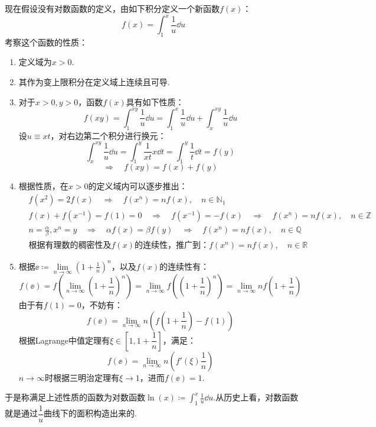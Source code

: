 现在假设没有对数函数的定义，由如下积分定义一个新函数$f(x)$：
\[f(x) = \int_{1}^{x}\frac{1}{u}\dd{u}\]
考察这个函数的性质：
\begin{enumerate}[circ]
    \item 定义域为$x>0$.
    \item 其作为变上限积分在定义域上连续且可导.
    \item 对于$x>0,y>0$，函数$f(x)$具有如下性质：
    \[f(xy) = \int_{1}^{xy}\frac{1}{u}\dd{u} = \int_{1}^{x}\frac{1}{u}\dd{u} + \int_{x}^{xy}\frac{1}{u}\dd{u}\]
    设$u \equiv xt$，对右边第二个积分进行换元：
    \[\int_{x}^{xy}\frac{1}{u}\dd{u} = \int_{1}^{y}\frac{1}{xt}x\dd{t} = \int_{1}^{y}\frac{1}{t}\dd{t} = f(y)\]
    \[\Rightarrow\quad f(xy) = f(x) + f(y)\]
    \item 根据性质，在$x>0$的定义域内可以逐步推出：
    \begin{align*}
        &f(x^2) = 2f(x) \quad\Rightarrow\quad f(x^n) = nf(x),\quad n\in\mathbb{N}_1\\
        &f(x)+f(x^{-1}) = f(1) = 0 \quad\Rightarrow\quad f(x^{-1}) = -f(x) \quad\Rightarrow\quad f(x^n) = nf(x),\quad n\in\mathbb{Z}\\
        &n=\frac{\alpha}{\beta},x^n=y \quad\Rightarrow\quad \alpha f(x) = \beta f(y) \quad\Rightarrow\quad f(x^n)=nf(x),\quad n\in\mathbb{Q}\\
        &\text{根据有理数的稠密性及$f(x)$的连续性，推广到：}f(x^n) = nf(x),\quad n\in\mathbb{R}
    \end{align*}
    \item 根据$\ee \coloneq \lim\limits_{n \to \infty}\left(1+\frac{1}{n}\right)^n$，以及$f(x)$的连续性有：
    \[f(\ee) = f\left(\lim_{n \to \infty}\left(1+\frac{1}{n}\right)^n\right) = \lim_{n \to \infty}f\left(\left(1+\frac{1}{n}\right)^n\right) = \lim_{n \to \infty}nf\left(1+\frac{1}{n}\right)\]
    由于有$f(1)=0$，不妨有：
    \[f(\ee) = \lim_{n\to\infty}n\left(f\left(1+\frac{1}{n}\right)-f(1)\right)\]
    根据Lagrange中值定理有$\xi\in\left[1,1+\dfrac{1}{n}\right]$，满足：
    \[f(\ee) = \lim_{n\to\infty}n\left(f'(\xi)\frac{1}{n}\right)\]
    $n\to\infty$时根据三明治定理有$\xi\to 1$，进而$f(\ee) = 1$.
\end{enumerate}
于是称满足上述性质的函数为对数函数$\displaystyle\ln(x) \coloneq \int_{1}^{x}\frac{1}{u}\dd{u}$.从历史上看，对数函数就是通过$\dfrac{1}{u}$曲线下的面积构造出来的.

